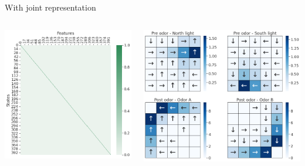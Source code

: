 \documentclass[bigger]{beamer}
\begin{document}
\begin{frame}[label={sec:orga888afd}]{With joint representation}
\begin{columns}
\begin{column}{0.5\columnwidth}
\begin{center}
\includegraphics[height=0.4\textheight]{img/features-ego-joint-repr.png}
\end{center}
\end{column}
\begin{column}{0.5\columnwidth}
\begin{center}
\includegraphics[width=\textwidth]{img/policy-allo-joint-repr.png}

\end{center}
\end{column}
\end{columns}
\end{frame}
\end{document}
